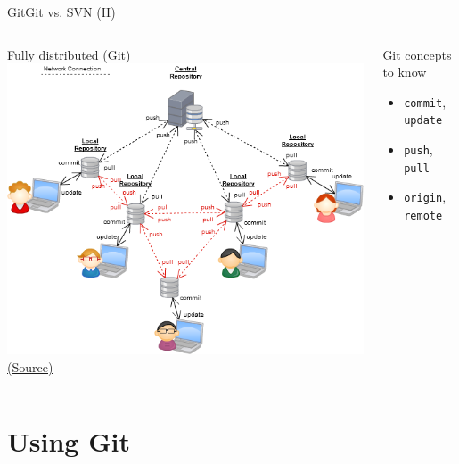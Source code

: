 \documentclass[10pt,compress]{beamer} %
\begin{document}
\begin{frame}{Git}{Git vs. SVN (II)}
\begin{center}
\begin{columns}
	\centering Fully distributed (Git)\\\smallskip
	\includegraphics[width=\linewidth]{figs/fulldistributed.png}
	\tiny \href{http://softwareengineering.stackexchange.com/questions/35074/im-a-subversion-geek-why-should-i-consider-or-not-consider-mercurial-or-git-or}{(Source)}

	\begin{block}{Git concepts to know}
	\begin{itemize}
	\item \texttt{commit}, \texttt{update}
	\item \texttt{push}, \texttt{pull}
	\item \texttt{origin}, \texttt{remote}
	\end{itemize}
	\end{block}
\end{columns}

\end{center}

\end{frame}


\section{Using Git}
\end{document}
